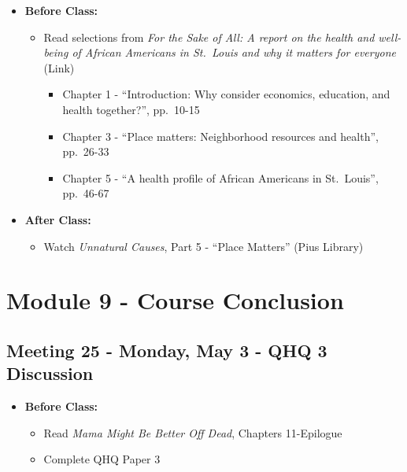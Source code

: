 \documentclass[
]{book}
\providecommand{\tightlist}{%
  \setlength{\itemsep}{0pt}\setlength{\parskip}{0pt}}
\begin{document}
\begin{itemize}
\tightlist
\item
  \textbf{Before Class:}

  \begin{itemize}
  \tightlist
  \item
    Read selections from \emph{For the Sake of All: A report on the health and well-being of African Americans in St.~Louis and why it matters for everyone} (Link)

    \begin{itemize}
    \tightlist
    \item
      Chapter 1 - ``Introduction: Why consider economics, education, and health together?'', pp.~10-15
    \item
      Chapter 3 - ``Place matters: Neighborhood resources and health'', pp.~26-33
    \item
      Chapter 5 - ``A health profile of African Americans in St.~Louis'', pp.~46-67
    \end{itemize}
  \end{itemize}
\item
  \textbf{After Class:}

  \begin{itemize}
  \tightlist
  \item
    Watch \emph{Unnatural Causes}, Part 5 - ``Place Matters'' (Pius Library)
  \end{itemize}
\end{itemize}

\newpage

\hypertarget{module-9---course-conclusion}{%
\section{Module 9 - Course Conclusion}\label{module-9---course-conclusion}}

\hypertarget{meeting-25---monday-may-3---qhq-3-discussion}{%
\subsection*{Meeting 25 - Monday, May 3 - QHQ 3 Discussion}\label{meeting-25---monday-may-3---qhq-3-discussion}}

\begin{itemize}
\tightlist
\item
  \textbf{Before Class:}

  \begin{itemize}
  \tightlist
  \item
    Read \emph{Mama Might Be Better Off Dead}, Chapters 11-Epilogue
  \item
    Complete QHQ Paper 3
  \end{itemize}
\end{itemize}
\end{document}
